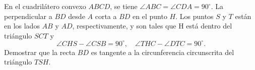 En el cuadrilátero convexo $ABCD$, se tiene $\angle ABC = \angle CDA = 90^{\circ}$. La perpendicular a $BD$ desde $A$ corta a $BD$ en el punto $H$. Los puntos $S$ y $T$ están en los lados $AB$ y $AD$, respectivamente, y son tales que H está dentro del triángulo $SCT$ y
\[\angle CHS -\angle CSB = 90^{\circ}, \quad \angle THC -\angle DTC = 90^{\circ} .\]
Demostrar que la recta $BD$ es tangente a la circunferencia circunscrita del triángulo $TSH$.